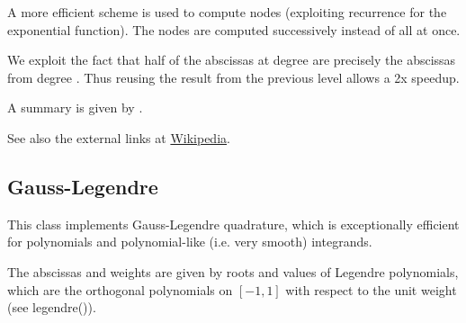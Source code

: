 \vpara
A more efficient scheme is used to compute nodes (exploiting recurrence for the exponential function). The nodes are computed successively instead of all at once.


We exploit the fact that half of the abscissas at degree are precisely the abscissas from degree . Thus reusing the result from the previous level allows a 2x speedup.



A summary is given by \cite{Bailey_2006,Bailey_2004}.

See also the external links at \href{http://en.wikipedia.org/wiki/Tanh-sinh_quadrature}{Wikipedia}.
%
%
%
%
%
%





\subsection{Gauss-Legendre}
\label{GaussLegendreGenerell}

This class implements Gauss-Legendre quadrature, which is exceptionally efficient for polynomials and polynomial-like (i.e. very smooth) integrands.

The abscissas and weights are given by roots and values of Legendre polynomials, which are the orthogonal polynomials on $[-1,1]$ with respect to the unit weight (see legendre()).

